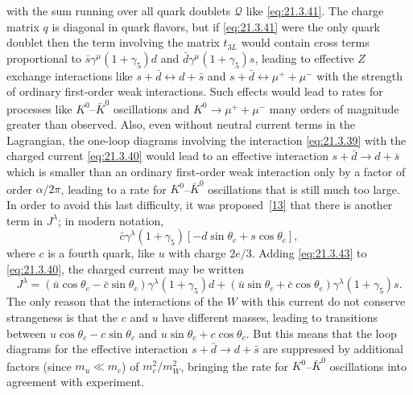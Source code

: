 with the sum running over all quark doublets $\mathcal Q$ like \eqref{eq:21.3.41}. The charge matrix $q$ is diagonal in quark flavors, but if \eqref{eq:21.3.41} were the only quark doublet then the term involving the matrix $t_{3L}$ would contain cross terms proportional to $\bar s\gamma^\mu(1+\gamma_5)d$ and $\bar d\gamma^\mu(1+\gamma_5)s$, leading to effective $Z$ exchange interactions like $s+\bar d\leftrightarrow d+\bar s$ and $s+\bar d\leftrightarrow\mu^++\mu^-$ with the strength of ordinary first-order weak interactions. Such effects would lead to rates for processes like $K^0$--$\bar K^0$ oscillations and $K^0\to\mu^++\mu^-$ many orders of magnitude greater than observed. Also, even without neutral current terms in the Lagrangian, the one-loop diagrams involving the interaction \eqref{eq:21.3.39} with the charged current \eqref{eq:21.3.40} would lead to an effective interaction $s+\bar d\to d+\bar s$ which is smaller than an ordinary first-order weak interaction only by a factor of order $\alpha/2\pi$, leading to a rate for $K^0$--$\bar K^0$ oscillations that is still much too large. In order to avoid this last difficulty, it was proposed~\hyperref[ch21-ref-13]{[13]} that there is another term in $J^\lambda$; in modern notation,
\begin{equation}
\bar c\gamma^\lambda(1+\gamma_5)
\left[-d\sin\theta_c+s\cos\theta_c\right],
\tag{21.3.43}\label{eq:21.3.43}
\end{equation}
where $c$ is a fourth quark, like $u$ with charge $2e/3$. Adding \eqref{eq:21.3.43} to \eqref{eq:21.3.40}, the charged current may be written
\[
J^\lambda
=(\bar u\cos\theta_c-\bar c\sin\theta_c)
\gamma^\lambda(1+\gamma_5)d
+(\bar u\sin\theta_c+\bar c\cos\theta_c)
\gamma^\lambda(1+\gamma_5)s.
\]
The only reason that the interactions of the $W$ with this current do not conserve strangeness is that the $c$ and $u$ have different masses, leading to transitions between $u\cos\theta_c-c\sin\theta_c$ and $u\sin\theta_c+c\cos\theta_c$. But this means that the loop diagrams for the effective interaction $s+\bar d\to d+\bar s$ are suppressed by additional factors (since $m_u\ll m_c$) of $m_c^2/m_W^2$, bringing the rate for $K^0$--$\bar K^0$ oscillations into agreement with experiment.

